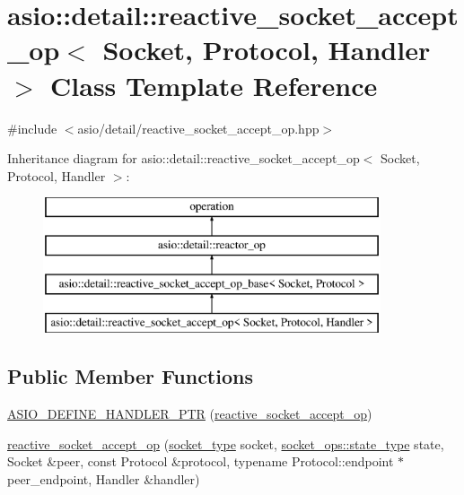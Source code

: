 \hypertarget{classasio_1_1detail_1_1reactive__socket__accept__op}{}\section{asio\+:\+:detail\+:\+:reactive\+\_\+socket\+\_\+accept\+\_\+op$<$ Socket, Protocol, Handler $>$ Class Template Reference}
\label{classasio_1_1detail_1_1reactive__socket__accept__op}


{\ttfamily \#include $<$asio/detail/reactive\+\_\+socket\+\_\+accept\+\_\+op.\+hpp$>$}

Inheritance diagram for asio\+:\+:detail\+:\+:reactive\+\_\+socket\+\_\+accept\+\_\+op$<$ Socket, Protocol, Handler $>$\+:\begin{figure}[H]
\begin{center}
\leavevmode
\includegraphics[height=4.000000cm]{classasio_1_1detail_1_1reactive__socket__accept__op}
\end{center}
\end{figure}
\subsection*{Public Member Functions}
\begin{DoxyCompactItemize}
\item 
\hyperlink{classasio_1_1detail_1_1reactive__socket__accept__op_acb8ea0fc64142371c17ad15cf20cb93f}{A\+S\+I\+O\+\_\+\+D\+E\+F\+I\+N\+E\+\_\+\+H\+A\+N\+D\+L\+E\+R\+\_\+\+P\+T\+R} (\hyperlink{classasio_1_1detail_1_1reactive__socket__accept__op}{reactive\+\_\+socket\+\_\+accept\+\_\+op})
\item 
\hyperlink{classasio_1_1detail_1_1reactive__socket__accept__op_a4ce11cb97a4219aeb6b80966e32982a4}{reactive\+\_\+socket\+\_\+accept\+\_\+op} (\hyperlink{namespaceasio_1_1detail_a6798c771dd84b79798b1a08150706ea9}{socket\+\_\+type} socket, \hyperlink{namespaceasio_1_1detail_1_1socket__ops_a5ce32ee297edef8833113ea35a933054}{socket\+\_\+ops\+::state\+\_\+type} state, Socket \&peer, const Protocol \&protocol, typename Protocol\+::endpoint $\ast$peer\+\_\+endpoint, Handler \&handler)
\end{DoxyCompactItemize}
